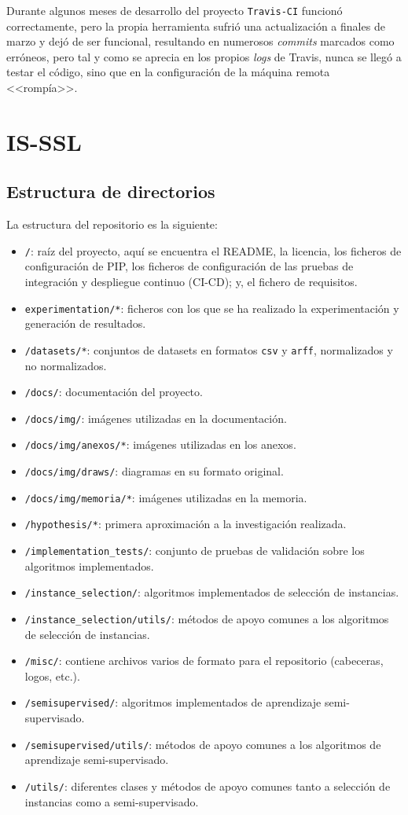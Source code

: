 Durante algunos meses de desarrollo del proyecto \texttt{Travis-CI} funcionó correctamente, pero la propia herramienta sufrió una actualización a finales de marzo y dejó de ser funcional, resultando en numerosos \textit{commits} marcados como erróneos, pero tal y como se aprecia en los propios \textit{logs} de Travis, nunca se llegó a testar el código, sino que en la configuración de la máquina remota <<rompía>>.

\clearpage
\section{IS-SSL}

\subsection{Estructura de directorios}
La estructura del repositorio es la siguiente:
\begin{itemize}
\item \texttt{/}: raíz del proyecto, aquí se encuentra el README, la licencia, los ficheros de configuración de PIP, los ficheros de configuración de las pruebas de integración y despliegue continuo (CI-CD); y, el fichero de requisitos.
\item \texttt{experimentation/*}: ficheros con los que se ha realizado la experimentación y generación de resultados.
\item \texttt{/datasets/*}: conjuntos de datasets en formatos \texttt{csv} y \texttt{arff}, normalizados y no normalizados.
\item \texttt{/docs/}: documentación del proyecto.
\item \texttt{/docs/img/}: imágenes utilizadas en la documentación.
\item \texttt{/docs/img/anexos/*}: imágenes utilizadas en los anexos.
\item \texttt{/docs/img/draws/}: diagramas en su formato original.
\item \texttt{/docs/img/memoria/*}: imágenes utilizadas en la memoria.
\item \texttt{/hypothesis/*}: primera aproximación a la investigación realizada.
\item \texttt{/implementation\_tests/}: conjunto de pruebas de validación sobre los algoritmos implementados.
\item \texttt{/instance\_selection/}: algoritmos implementados de selección de instancias.
\item \texttt{/instance\_selection/utils/}: métodos de apoyo comunes a los algoritmos de selección de instancias.
\item \texttt{/misc/}: contiene archivos varios de formato para el repositorio (cabeceras, logos, etc.).
\item \texttt{/semisupervised/}: algoritmos implementados de aprendizaje semi-supervisado.
\item \texttt{/semisupervised/utils/}: métodos de apoyo comunes a los algoritmos de aprendizaje semi-supervisado.
\item \texttt{/utils/}: diferentes clases y métodos de apoyo comunes tanto a selección de instancias como a semi-supervisado.
\end{itemize}

